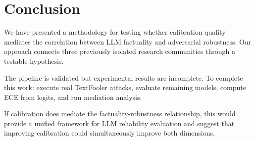 \section{Conclusion}

We have presented a methodology for testing whether calibration quality mediates the correlation between LLM factuality and adversarial robustness. Our approach connects three previously isolated research communities through a testable hypothesis.

The pipeline is validated but experimental results are incomplete. To complete this work: execute real TextFooler attacks, evaluate remaining models, compute ECE from logits, and run mediation analysis.

If calibration does mediate the factuality-robustness relationship, this would provide a unified framework for LLM reliability evaluation and suggest that improving calibration could simultaneously improve both dimensions.
